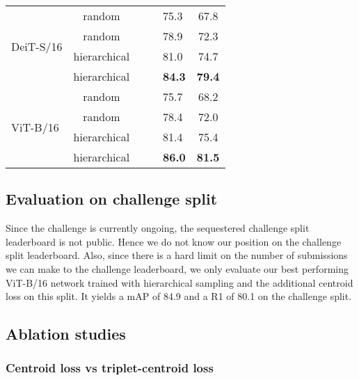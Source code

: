\documentclass{article}
\begin{document}
\begin{table}
\begin{tabular}{@{}lccclc@{}}
    \multirow{4}{*}[-5pt]{DeiT-S/16} & random &  &  & 75.3 & 67.8\\
\addlinespace[0.5em]
    & random &  &  & 78.9 & 72.3\\
\addlinespace[0.5em]
    & hierarchical &  &  & 81.0 & 74.7 \\
\addlinespace[0.5em]
    & hierarchical &  &  & \textbf{84.3} & \textbf{79.4}\\
    \midrule

    \multirow{4}{*}[-5pt]{ViT-B/16} & random &  &  & 75.7 & 68.2 \\
\addlinespace[0.5em]
    & random &  &  & 78.4 & 72.0\\
\addlinespace[0.5em]
    & hierarchical &  &  & 81.4 & 75.4\\
\addlinespace[0.5em]
    & hierarchical &  &  & \textbf{86.0} & \textbf{81.5}\\

    \bottomrule
  \end{tabular}
\end{table}

\subsection{Evaluation on challenge split}

Since the challenge is currently ongoing, the sequestered challenge split leaderboard is not public. Hence we do not know our position on the challenge split leaderboard. Also, since there is a hard limit on the number of submissions we can make to the challenge leaderboard, we only evaluate our best performing ViT-B/16 network trained with hierarchical sampling and the additional centroid loss on this split. It yields a mAP of 84.9 and a R1 of 80.1 on the challenge split.

\subsection{Ablation studies}















\subsubsection{Centroid loss vs triplet-centroid loss}
\label{sec:centroid_vs_triplet_centroid}
\end{document}
